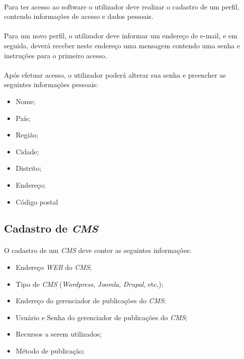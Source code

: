 \documentclass[a4paper,12pt]{article}
\def\cms{\emph{CMS}}
\begin{document}
\paragraph{}
Para ter acesso ao software o utilizador deve realizar o cadastro de um perfil, contendo informações de acesso e dados pessoais.
\paragraph{}
Para um novo perfil, o utilizador deve informar um endereço de e-mail, e em seguida, deverá receber neste endereço uma mensagem contendo uma senha e instruções para o primeiro acesso.
\paragraph{}
Após efetuar acesso, o utilizador poderá alterar sua senha e preencher as seguintes informações pessoais:

\begin{itemize}
\item Nome;
\item País;
\item Região;
\item Cidade;
\item Distrito;
\item Endereço;
\item Código postal
\end{itemize}

\subsection{Cadastro de \cms{}}

\paragraph{}
O cadastro de um \cms{} deve conter as seguintes informações:

\begin{itemize}
\item Endereço \emph{WEB} do \cms{};
\item Tipo de \cms{} (\emph{Wordpress}, \emph{Joomla}, \emph{Drupal}, etc.);
\item Endereço do gerenciador de publicações do \cms{};
\item Usuário e Senha do gerenciador de publicações do \cms{};
\item Recursos a serem utilizados;
\item Método de publicação;
\end{itemize}
\end{document}
